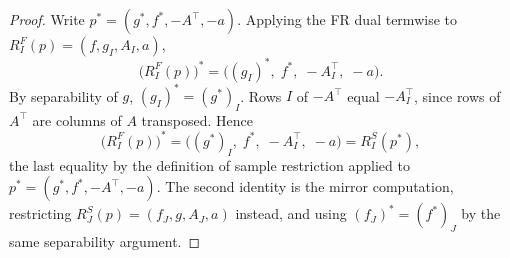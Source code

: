 \begin{proof}
Write \(p^*=(g^*,f^*,-A^\top,-a)\). Applying the FR dual termwise to
\(R^F_I(p)=(f,g_I,A_I,a)\),
\[
\bigl(R^F_I(p)\bigr)^*
=
\bigl((g_I)^*,\;f^*,\;-A_I^\top,\;-a\bigr).
\]
By separability of \(g\), \((g_I)^*=(g^*)_I\). Rows \(I\) of
\(-A^\top\) equal \(-A_I^\top\), since rows of \(A^\top\) are columns of
\(A\) transposed. Hence
\[
\bigl(R^F_I(p)\bigr)^*
=
\bigl((g^*)_I,\;f^*,\;-A_I^\top,\;-a\bigr)
=
R^S_I(p^*),
\]
the last equality by the definition of sample restriction applied to
\(p^*=(g^*,f^*,-A^\top,-a)\). The second identity is the mirror
computation, restricting \(R^S_J(p)=(f_J,g,A_J,a)\) instead, and using
\((f_J)^*=(f^*)_J\) by the same separability argument.
\end{proof}

 
